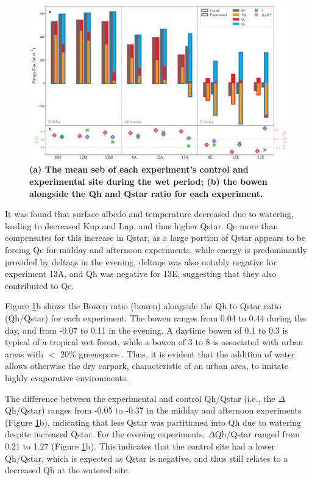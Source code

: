 \documentclass[final,3p,times,authoryear]{elsarticle}
\begin{document}
\begin{figure}
\centering
\includegraphics[trim={0 0 0 0},clip,scale=1.0]{pict017.png}
\caption{\bf (a) The mean \gls{seb} of each experiment's control and experimental site during the wet period; (b) the \gls{bowen} alongside the \gls{Qh} and \gls{Qstar} ratio for each experiment.}
 \label{fig:3.6}
\end{figure}

It was found that surface albedo and temperature decreased due to watering, leading to
decreased \gls{Kup} and \gls{Lup}, and thus higher \gls{Qstar}. \gls{Qe} more than compensates for this increase in \gls{Qstar}, as a large portion of \gls{Qstar} appears to be forcing \gls{Qe} for midday and afternoon experiments, while energy is predominantly provided by \gls{deltaqs} in the evening. \gls{deltaqs} was also notably negative for experiment 13A, and \gls{Qh} was negative for 13E, suggesting that they also contributed to \gls{Qe}.

Figure \ref{fig:3.6}b shows the Bowen ratio (\gls{bowen}) alongside the \gls{Qh} to \gls{Qstar} ratio (\gls{Qh}/\gls{Qstar}) for each experiment. The \gls{bowen} ranges from 0.04 to 0.44 during the day, and from -0.07 to 0.11 in the evening. A daytime \gls{bowen} of 0.1 to 0.3 is typical of a tropical wet forest, while a \gls{bowen} of 3 to 8 is associated with urban areas with $<$ 20\% greenspace \citep{Oke2017}. Thus, it is evident that the addition of water allows otherwise the dry carpark, characteristic of an urban area, to imitate highly evaporative environments.

The difference between the experimental and control \gls{Qh}/\gls{Qstar} (i.e., the $\Delta$\gls{Qh}/\gls{Qstar}) ranges from -0.05 to -0.37 in the midday and afternoon experiments (Figure \ref{fig:3.6}b), indicating that less \gls{Qstar} was partitioned into \gls{Qh} due to watering despite increased \gls{Qstar}. For the evening experiments, $\Delta$\gls{Qh}/\gls{Qstar} ranged from 0.21 to 1.27 (Figure \ref{fig:3.6}b). This indicates that the control site had a lower \gls{Qh}/\gls{Qstar}, which is expected as \gls{Qstar} is negative, and thus still relates to a decreased \gls{Qh} at the watered site.
\end{document}
